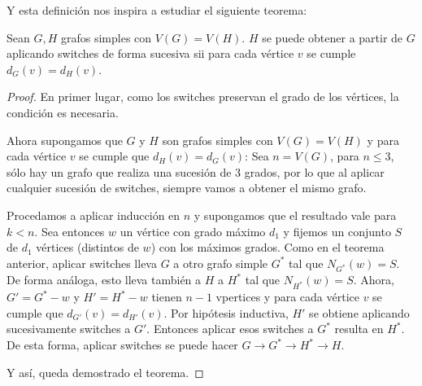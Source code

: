 Y esta definición nos inspira a estudiar el siguiente teorema:

\begin{teo}
    Sean $G,H$ grafos simples con $V(G) = V(H)$. $H$ se puede obtener a partir de $G$ aplicando switches de forma sucesiva sii para cada vértice $v$ se cumple $d_G(v) = d_H(v)$.
\end{teo}

\begin{proof}
    En primer lugar, como los switches preservan el grado de los vértices, la condición es necesaria.
    
    Ahora supongamos que $G$ y $H$ son grafos simples con $V(G) = V(H)$ y para cada vértice $v$ se cumple que $d_H(v) = d_G(v)$: Sea $n = V(G)$, para $n \leq 3$, sólo hay un grafo que realiza una sucesión de $3$ grados, por lo que al aplicar cualquier sucesión de switches, siempre vamos a obtener el mismo grafo.
    
    Procedamos a aplicar inducción en $n$ y supongamos que el resultado vale para $k < n$. Sea entonces $w$ un vértice con grado máximo $d_1$ y fijemos un conjunto $S$ de $d_1$ vértices (distintos de $w$) con los máximos grados. Como en el teorema anterior, aplicar switches lleva $G$ a otro grafo simple $G^*$ tal que $N_{G^*}(w) = S$. De forma análoga, esto lleva también a $H$ a $H^*$ tal que $N_{H^*}(w) = S$. Ahora, $G' = G^* - w$ y $H' = H^* - w$ tienen $n-1$ vpertices y para cada vértice $v$ se cumple que $d_{G'}(v) = d_{H'}(v)$. Por hipótesis inductiva, $H'$ se obtiene aplicando sucesivamente switches a $G'$. Entonces aplicar esos switches a $G^*$ resulta en $H^*$. De esta forma, aplicar switches se puede hacer $G \rightarrow G^* \rightarrow H^* \rightarrow H$.
    
    Y así, queda demostrado el teorema.
\end{proof}